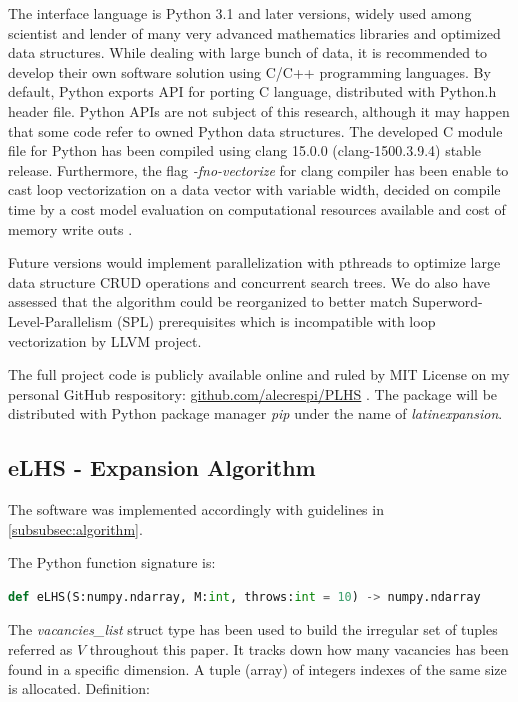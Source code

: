 \documentclass[12pt]{extarticle}
\begin{document}
The interface language is Python 3.1 and later versions, widely used among scientist and lender of many very advanced mathematics libraries and optimized data structures. While dealing with large bunch of data, it is recommended to develop their own software solution using C/C++ programming languages. By default, Python exports API for porting C language, distributed with Python.h header file. Python APIs are not subject of this research, although it may happen that some code refer to owned Python data structures. The developed C module file for Python has been compiled using clang 15.0.0 (clang-1500.3.9.4) stable release. Furthermore, the flag \emph{-fno-vectorize} for clang compiler has been enable to cast loop vectorization on a data vector with variable width, decided on compile time by a cost model evaluation on computational resources available and cost of memory write outs .

Future versions would implement parallelization with pthreads to optimize large data structure CRUD operations and concurrent search trees. We do also have assessed that the algorithm could be reorganized to better match Superword-Level-Parallelism (SPL) prerequisites which is incompatible with loop vectorization by LLVM project.

The full project code is publicly available online and ruled by MIT License on my personal GitHub respository: \url{github.com/alecrespi/PLHS} . The package will be distributed with Python package manager \emph{pip} under the name of \emph{latinexpansion}.


\subsection{eLHS - Expansion Algorithm}
\label{subsec:eLHS_code}
The software was implemented accordingly with guidelines in \cref{subsubsec:algorithm}.

The Python function signature is:

\begin{lstlisting}[language=Python]
def eLHS(S:numpy.ndarray, M:int, throws:int = 10) -> numpy.ndarray
\end{lstlisting}

The \emph{vacancies{\_}list} struct type has been used to build the irregular set of tuples referred as $V$ throughout this paper. It tracks down how many vacancies has been found in a specific dimension. A tuple (array) of integers indexes of the same size is allocated. Definition:
\end{document}
